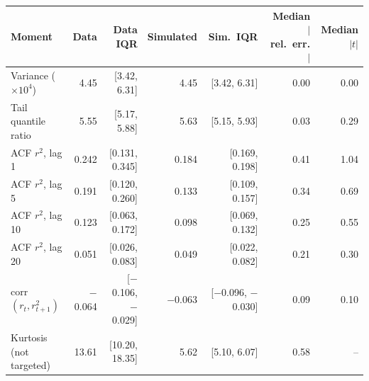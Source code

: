 \begin{tabular}{lrrrrrr}
\toprule
Moment & Data & Data IQR & Simulated & Sim.\ IQR & Median $|$rel.\ err.$|$ & Median $|t|$ \\
\midrule
Variance ($\times 10^4$) & 4.45 & [3.42, 6.31] & 4.45 & [3.42, 6.31] & 0.00 & 0.00 \\
Tail quantile ratio & 5.55 & [5.17, 5.88] & 5.63 & [5.15, 5.93] & 0.03 & 0.29 \\
ACF $r^2$, lag 1 & 0.242 & [0.131, 0.345] & 0.184 & [0.169, 0.198] & 0.41 & 1.04 \\
ACF $r^2$, lag 5 & 0.191 & [0.120, 0.260] & 0.133 & [0.109, 0.157] & 0.34 & 0.69 \\
ACF $r^2$, lag 10 & 0.123 & [0.063, 0.172] & 0.098 & [0.069, 0.132] & 0.25 & 0.55 \\
ACF $r^2$, lag 20 & 0.051 & [0.026, 0.083] & 0.049 & [0.022, 0.082] & 0.21 & 0.30 \\
corr$(r_t, r_{t+1}^2)$ & $-$0.064 & [$-$0.106, $-$0.029] & $-$0.063 & [$-$0.096, $-$0.030] & 0.09 & 0.10 \\
Kurtosis (not targeted) & 13.61 & [10.20, 18.35] & 5.62 & [5.10, 6.07] & 0.58 & -- \\
\bottomrule
\end{tabular}
